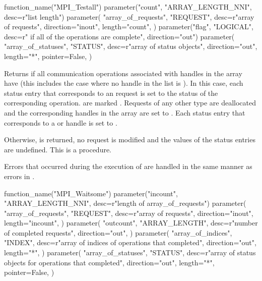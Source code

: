 \begin{mpi-binding}
    function_name("MPI_Testall")
    parameter("count", "ARRAY_LENGTH_NNI", desc=r"list length")
    parameter(
        "array_of_requests",
        "REQUEST",
        desc=r"array of requests",
        direction="inout",
        length="count",
    )
    parameter("flag", "LOGICAL", desc=r" if all of the operations are complete", direction="out")
    parameter(
        "array_of_statuses",
        "STATUS",
        desc=r"array of status objects",
        direction="out",
        length="*",
        pointer=False,
    )
\end{mpi-binding}

Returns 
if all communication operations associated
with  handles in the array have  (this includes the
case where no handle in the list is ).
In this case, each status entry that corresponds to an
 request
is set to the status of the corresponding
operation.    are marked .
Requests of any other type are deallocated and the corresponding handles in
the array are
set to .
Each status entry that corresponds to a  or 
handle is set to .

Otherwise,
 is returned, no request is modified
and the values of the status entries are undefined.
This is a  procedure.

Errors that occurred during the execution of 
are handled in the same manner as errors in .

\begin{mpi-binding}
    function_name("MPI_Waitsome")
    parameter("incount", "ARRAY_LENGTH_NNI", desc=r"length of array_of_requests")
    parameter(
        "array_of_requests",
        "REQUEST",
        desc=r"array of requests",
        direction="inout",
        length="incount",
    )
    parameter(
        "outcount",
        "ARRAY_LENGTH",
        desc=r"number of completed requests",
        direction="out",
    )
    parameter(
        "array_of_indices",
        "INDEX",
        desc=r"array of indices of operations that completed",
        direction="out",
        length="*",
    )
    parameter(
        "array_of_statuses",
        "STATUS",
        desc=r"array of status objects for operations that completed",
        direction="out",
        length="*",
        pointer=False,
    )
\end{mpi-binding}

